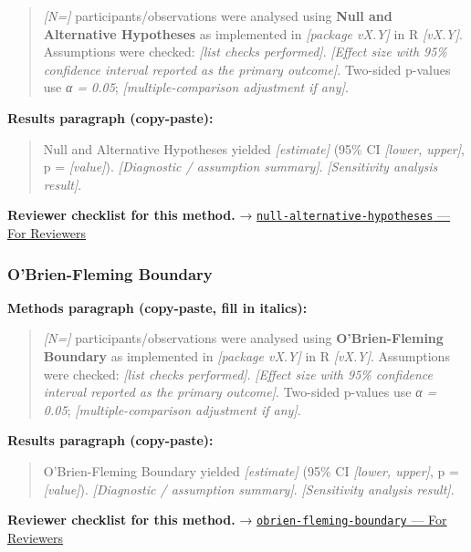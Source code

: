 \documentclass[
]{article}
\begin{document}
\begin{quote}
\emph{{[}N={]}} participants/observations were analysed using
\textbf{Null and Alternative Hypotheses} as implemented in
\emph{{[}package vX.Y{]}} in R \emph{{[}vX.Y{]}}. Assumptions were
checked: \emph{{[}list checks performed{]}}. \emph{{[}Effect size with
95\% confidence interval reported as the primary outcome{]}}. Two-sided
p-values use \emph{α = 0.05}; \emph{{[}multiple-comparison adjustment if
any{]}}.
\end{quote}

\textbf{Results paragraph (copy-paste):}

\begin{quote}
Null and Alternative Hypotheses yielded \emph{{[}estimate{]}} (95\% CI
\emph{{[}lower, upper{]}}, p = \emph{{[}value{]}}). \emph{{[}Diagnostic
/ assumption summary{]}}. \emph{{[}Sensitivity analysis result{]}}.
\end{quote}

\textbf{Reviewer checklist for this method.} →
\href{../chapters/04-inferential/null-alternative-hypotheses.Rmd\#for-reviewers}{\texttt{null-alternative-hypotheses}
--- For Reviewers}

\subsubsection{O'Brien-Fleming Boundary}\label{obrien-fleming-boundary}

\textbf{Methods paragraph (copy-paste, fill in italics):}

\begin{quote}
\emph{{[}N={]}} participants/observations were analysed using
\textbf{O'Brien-Fleming Boundary} as implemented in \emph{{[}package
vX.Y{]}} in R \emph{{[}vX.Y{]}}. Assumptions were checked: \emph{{[}list
checks performed{]}}. \emph{{[}Effect size with 95\% confidence interval
reported as the primary outcome{]}}. Two-sided p-values use \emph{α =
0.05}; \emph{{[}multiple-comparison adjustment if any{]}}.
\end{quote}

\textbf{Results paragraph (copy-paste):}

\begin{quote}
O'Brien-Fleming Boundary yielded \emph{{[}estimate{]}} (95\% CI
\emph{{[}lower, upper{]}}, p = \emph{{[}value{]}}). \emph{{[}Diagnostic
/ assumption summary{]}}. \emph{{[}Sensitivity analysis result{]}}.
\end{quote}

\textbf{Reviewer checklist for this method.} →
\href{../chapters/14-clinical/obrien-fleming-boundary.Rmd\#for-reviewers}{\texttt{obrien-fleming-boundary}
--- For Reviewers}
\end{document}

